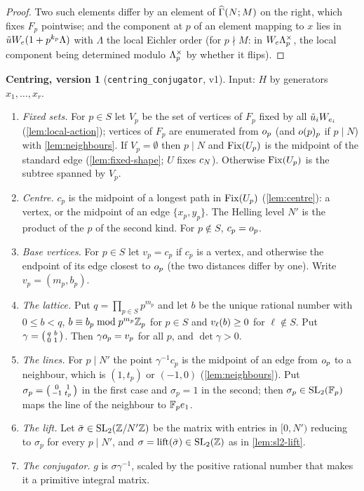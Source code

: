 \begin{proof}
Two such elements differ by an element of $\GammaPrincipal[ad]{N}{M}$ on the
right, which fixes $F_p$ pointwise; and the component at $p$ of an element
mapping to $x$ lies in $\tilde uW_{e}(1 + p^{k_p}\Lambda)$ with
$\Lambda$ the local Eichler order (for $p \nmid M$: in
$W_{e}\Lambda_{p}^{\times}$, the local component being determined
modulo $\Lambda_{p}^{\times}$ by whether it flips).
\end{proof}

\begin{procedure}
\textbf{Centring, version 1} (\texttt{centring\_conjugator}, v1). Input: $H$ by
generators $x_1, \ldots, x_r$.
\begin{enumerate}
\item \emph{Fixed sets.} For $p \in S$ let $V_p$ be the set of vertices of
  $F_p$ fixed by all $\tilde u_iW_{e_i}$ (\cref{lem:local-action});
  vertices of $F_p$ are enumerated from $o_{p}$ (and
  $o(p)_{p}$ if $p \mid N$) with \cref{lem:neighbours}. If
  $V_p = \emptyset$ then $p \mid N$ and $\mathrm{Fix}(U_p)$ is the midpoint of
  the standard edge (\cref{lem:fixed-shape}; $U$ fixes $c_{N}$).
  Otherwise $\mathrm{Fix}(U_p)$ is the subtree spanned by $V_p$.
\item \emph{Centre.} $c_p$ is the midpoint of a longest path in
  $\mathrm{Fix}(U_p)$ (\cref{lem:centre}): a vertex, or the midpoint of an edge
  $\{x_p, y_p\}$. The Helling level $N'$ is the product of the $p$ of the
  second kind. For $p \notin S$, $c_p = o_{p}$.
\item \emph{Base vertices.} For $p \in S$ let $v_p = c_p$ if $c_p$ is a
  vertex, and otherwise the endpoint of its edge closest to
  $o_{p}$ (the two distances differ by one). Write
  $v_p = (m_p, b_p)$.
\item \emph{The lattice.} Put $q = \prod_{p \in S} p^{m_p}$ and let $b$ be the
  unique rational number with $0 \leq b < q$, $b \equiv b_p \bmod
  p^{m_p}\mathbb{Z}_{p}$ for $p \in S$ and $v_{\ell}(b) \geq 0$ for
  $\ell \notin S$. Put $\gamma = \left(\begin{smallmatrix} q & b \\ 0 & 1 \end{smallmatrix}\right)$. Then
  $\gamma o_{p} = v_p$ for all $p$, and $\det\gamma > 0$.
\item \emph{The lines.} For $p \mid N'$ the point $\gamma^{-1}c_p$ is the
  midpoint of an edge from $o_{p}$ to a neighbour, which is
  $(1, t_p)$ or $(-1, 0)$ (\cref{lem:neighbours}). Put
  $\sigma_p = \left(\begin{smallmatrix} 0 & 1 \\ -1 & t_p \end{smallmatrix}\right)$ in the first case and $\sigma_p = 1$
  in the second; then $\sigma_p \in \SL{2}{\FF{p}}$ maps the line of the
  neighbour to $\mathbb{F}_{p}e_{1}$.
\item \emph{The lift.} Let $\bar\sigma \in \SL{2}{\ResidueRing{N'}}$ be the
  matrix with entries in $[0, N')$ reducing to $\sigma_p$ for every $p \mid N'$,
  and $\sigma = \mathrm{lift}(\bar\sigma) \in \SL{2}{\ZZ}$ as in
  \cref{lem:sl2-lift}.
\item \emph{The conjugator.} $g$ is $\sigma\gamma^{-1}$, scaled by the
  positive rational number that makes it a primitive integral matrix.
\end{enumerate}
\end{procedure}

